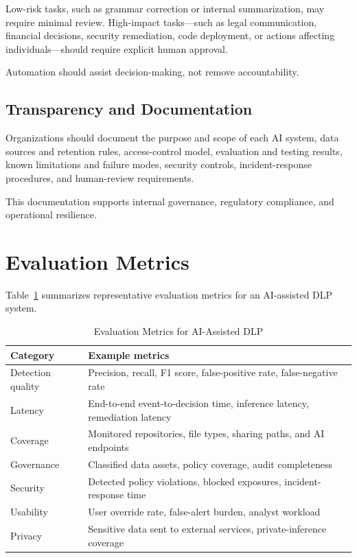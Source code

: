 \documentclass[conference]{IEEEtran}
\begin{document}
Low-risk tasks, such as grammar correction or internal summarization, may require minimal review. High-impact tasks---such as legal communication, financial decisions, security remediation, code deployment, or actions affecting individuals---should require explicit human approval.

Automation should assist decision-making, not remove accountability.

\subsection{Transparency and Documentation}

Organizations should document the purpose and scope of each AI system, data sources and retention rules, access-control model, evaluation and testing results, known limitations and failure modes, security controls, incident-response procedures, and human-review requirements.

This documentation supports internal governance, regulatory compliance, and operational resilience.

\section{Evaluation Metrics}

Table~\ref{tab:metrics} summarizes representative evaluation metrics for an AI-assisted DLP system.

\begin{table}[!t]
\caption{Evaluation Metrics for AI-Assisted DLP}
\label{tab:metrics}
\centering
\begin{tabular}{@{}p{}p{}@{}}
\toprule
\textbf{Category} & \textbf{Example metrics} \\
\midrule
Detection quality & Precision, recall, F1 score, false-positive rate, false-negative rate \\
Latency & End-to-end event-to-decision time, inference latency, remediation latency \\
Coverage & Monitored repositories, file types, sharing paths, and AI endpoints \\
Governance & Classified data assets, policy coverage, audit completeness \\
Security & Detected policy violations, blocked exposures, incident-response time \\
Usability & User override rate, false-alert burden, analyst workload \\
Privacy & Sensitive data sent to external services, private-inference coverage \\
\bottomrule
\end{tabular}
\end{table}
\end{document}
